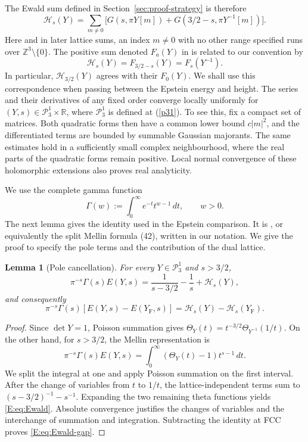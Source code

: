 \documentclass[reqno,english]{amsart}
\newtheorem{lemma}[theorem]{Lemma}
\theoremstyle{definition}
\newtheorem{open problem}[theorem]{Open Problem}
\theoremstyle{remark}
\theoremstyle{plain}
\newcommand{\R}{{\mathbb R}}
\numberwithin{equation}{section}
\newcommand{\Z}{\mathbb Z}
\newcommand{\YF}{Y_{\mathrm F}}
\newcommand{\HH}{\mathcal H}
\newcommand{\PP}{\mathcal P_3^1}
\begin{document}
The Ewald sum defined in Section~\ref{sec:proof-strategy} is therefore
\begin{equation}
 \HH_s(Y)=\sum_{m\ne0}\bigl[G(s,\pi Y[m])+G(3/2-s,\pi Y^{-1}[m])\bigr].
 \label{E:eq:H}
\end{equation}
Here and in later lattice sums, an index $m\ne0$ with no other range
specified runs over $\Z^3\setminus\{0\}$. The positive sum denoted
$F_a(Y)$ in \cite[(25)]{SS} is related to our convention by
\[
 \HH_s(Y)=F_{3/2-s}(Y)=F_s(Y^{-1}).
\]
In particular, $\HH_{3/2}(Y)$ agrees with their $F_0(Y)$. We shall use
this correspondence when passing between the Epstein energy and height.
The series and their derivatives of any fixed order converge locally
uniformly for $(Y,s)\in\PP\times\R$, where $\PP$ is defined at (\ref{p31}). To see this, fix a compact set of
matrices. Both quadratic forms then have a common lower bound
$c|m|^2$, and the differentiated terms are bounded by summable Gaussian
majorants. The same estimates hold in a sufficiently small complex
neighbourhood, where the real parts of the quadratic forms remain
positive. Local normal convergence of these holomorphic extensions also
proves real analyticity.

We use the complete gamma function
\[
 \Gamma(w):=\int_0^\infty e^{-t}t^{w-1}\,dt,\qquad w>0.
\]
The next lemma gives the identity used in the Epstein comparison. It is
\cite[(23)]{SS}, or equivalently the split Mellin formula (42), written
in our notation. We give the proof to specify the pole terms and the
contribution of the dual lattice.
\begin{lemma}[Pole cancellation]\label{E:lem:Ewald}
For every $Y\in\PP$ and $s>3/2$,
\begin{equation}
 \pi^{-s}\Gamma(s)E(Y,s)=\frac1{s-3/2}-\frac1s+\HH_s(Y),
 \label{E:eq:Ewald}
\end{equation}
and consequently
\begin{equation}
 \pi^{-s}\Gamma(s)[E(Y,s)-E(\YF,s)]=\HH_s(Y)-\HH_s(\YF).
 \label{E:eq:Ewald-gap}
\end{equation}
\end{lemma}
\begin{proof}
Since $\det Y=1$, Poisson summation gives
$\Theta_Y(t)=t^{-3/2}\Theta_{Y^{-1}}(1/t)$. On the other hand, for
$s>3/2$, the Mellin representation is
\[
 \pi^{-s}\Gamma(s)E(Y,s)=\int_0^\infty(\Theta_Y(t)-1)t^{s-1}\,dt.
\]
We split the integral at one and apply Poisson summation on the first
interval. After the change of variables from $t$ to $1/t$, the
lattice-independent terms sum to $(s-3/2)^{-1}-s^{-1}$. Expanding the
two remaining theta functions yields \eqref{E:eq:Ewald}. Absolute
convergence justifies the changes of variables and the interchange of
summation and integration. Subtracting the identity at FCC proves
\eqref{E:eq:Ewald-gap}.
\end{proof}
\end{document}
